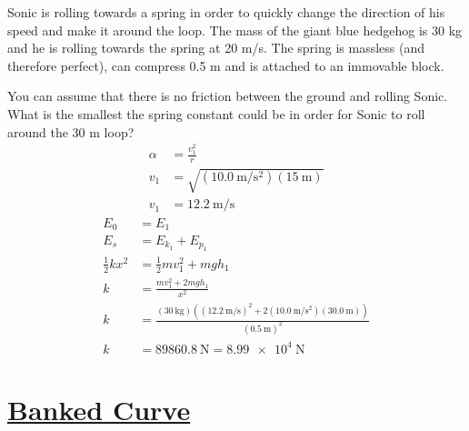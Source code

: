 \documentclass{article}
\begin{document}
Sonic is rolling towards a spring in order to quickly change the direction of his speed and make it around the loop. The mass of the giant blue hedgehog is 30 kg and he is rolling towards the spring at 20 m/s. The spring is massless (and therefore perfect), can compress 0.5 m and is attached to an immovable block.

You can assume that there is no friction between the ground and rolling Sonic. What is the smallest the spring constant could be in order for Sonic to roll around the 30 m loop?
\begin{align*}
	\alpha & = \frac{ v_1^2 }{ r } \\
	v_1 & = \sqrt{ (\SI{10.0}{\meter \per \second \squared})(\SI{15}{\meter}) } \\
	v_1 & = \SI{12.2}{\meter \per \second}
\end{align*}
\begin{align*}
	E_0 & = E_1 \\
	E_s & = E_{k_1} + E_{p_1} \\
	\frac{1}{2}kx^2 & = \frac{1}{2}mv_1^2 + mgh_1 \\
	k & = \frac{ mv_1^2 + 2mgh_1 }{ x^2 } \\
	k & = \frac{ (\SI{30}{\kilogram})((\SI{12.2}{\meter \per \second})^2 + 2(\SI{10.0}{\meter \per \second \squared})(\SI{30.0}{\meter})) }{ (\SI{0.5}{\meter})^2 } \\
	k & = \SI{89860.8}{\newton} = \SI{8.99e4}{\newton}
\end{align*}

\section{
	\href{https://www.uwgb.edu/fenclh/problems/dynamics/circular/2/}{Banked Curve}
}
\end{document}
